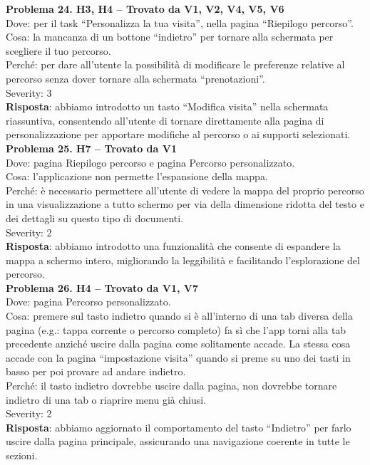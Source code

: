 \documentclass{article}
\begin{document}
\noindent \textbf{Problema 24. H3, H4 – Trovato da V1, V2, V4, V5, V6} \\
Dove: per il task “Personalizza la tua visita”, nella pagina “Riepilogo percorso”. \\
Cosa: la mancanza di un bottone “indietro” per tornare alla schermata per scegliere il tuo percorso. \\
Perché: per dare all’utente la possibilità di modificare le preferenze relative al percorso senza dover tornare alla schermata “prenotazioni”. \\
Severity: 3 \\
\textbf{Risposta}: abbiamo introdotto un tasto “Modifica visita” nella schermata riassuntiva, consentendo all’utente di tornare direttamente alla pagina di personalizzazione per apportare modifiche al percorso o ai supporti selezionati.\\

\noindent \textbf{Problema 25. H7 – Trovato da V1} \\
Dove: pagina Riepilogo percorso e pagina Percorso personalizzato. \\
Cosa: l’applicazione non permette l’espansione della mappa. \\
Perché: è necessario permettere all’utente di vedere la mappa del proprio percorso in una visualizzazione a tutto schermo per via della dimensione ridotta del testo e dei dettagli su questo tipo di documenti. \\
Severity: 2 \\
\textbf{Risposta}: abbiamo introdotto una funzionalità che consente di espandere la mappa a schermo intero, migliorando la leggibilità e facilitando l’esplorazione del percorso.\\

\noindent \textbf{Problema 26. H4 – Trovato da V1, V7} \\
Dove: pagina Percorso personalizzato. \\
Cosa: premere sul tasto indietro quando si è all’interno di una tab diversa della pagina (e.g.: tappa corrente o percorso completo) fa sì che l’app torni alla tab precedente anziché uscire dalla pagina come solitamente accade. La stessa cosa accade con la pagina “impostazione visita” quando si preme su uno dei tasti in basso per poi provare ad andare indietro. \\
Perché: il tasto indietro dovrebbe uscire dalla pagina, non dovrebbe tornare indietro di una tab o riaprire menu già chiusi. \\
Severity: 2 \\
\textbf{Risposta}: abbiamo aggiornato il comportamento del tasto “Indietro” per farlo uscire dalla pagina principale, assicurando una navigazione coerente in tutte le sezioni.\\
\end{document}

